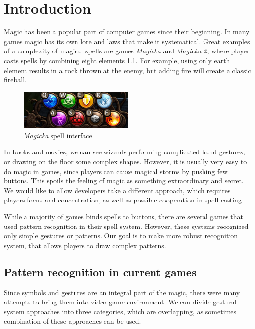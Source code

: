\chapter{Introduction}
\label{chap:gf}

Magic has been a popular part of computer games since their beginning. In many games magic has its own lore and laws that make it systematical. Great examples of a complexity of magical spells are games \emph{Magicka} and \emph{Magicka 2}, where player casts spells by combining eight elements \ref{fig:magicka}. For example, using only earth element results in a rock thrown at the enemy, but adding fire will create a classic fireball.
\begin{figure}[!htb]
  \centering
  \label{fig:magicka}
    \includegraphics[width=0.5\textwidth]{ext/magicka.png}
    \caption{\emph{Magicka} spell interface}
\end{figure}

In books and movies, we can see wizards performing complicated hand gestures, or drawing on the floor some complex shapes. However, it is usually very easy to do magic in games, since players can cause magical storms by pushing few buttons. This spoils the feeling of magic as something extraordinary and secret. We would like to allow developers take a different approach, which requires players focus and concentration, as well as possible cooperation in spell casting.

While a majority of games binds spells to buttons, there are several games that used pattern recognition in their spell system. However, these systems recognized only simple gestures or patterns. Our goal is to make more robust recognition system, that allows players to draw complex patterns.

\section{Pattern recognition in current games}

Since symbols and gestures are an integral part of the magic, there were many attempts to bring them into video game environment. We can divide gestural system approaches into three categories, which are overlapping, as sometimes combination of these approaches can be used.


